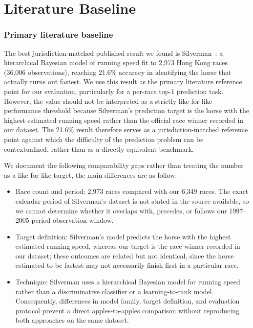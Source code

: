 \section{Literature Baseline}
\label{sec:baseline-lit}

\subsubsection*{\textbf{Primary literature baseline}}
The best jurisdiction-matched published result we found is Silverman~\cite{ejeA_gupta2023}:
a hierarchical Bayesian model of running speed fit to 2,973 Hong Kong races
(36,006 observations), reaching 21.6\% accuracy in identifying the horse that
actually turns out fastest. We use this result as the primary literature reference
point for our evaluation, particularly for a per-race top-1 prediction task.
However, the value should not be interpreted as a strictly like-for-like
performance threshold because Silverman's prediction target is the horse with the
highest estimated running speed rather than the official race winner recorded in
our dataset. The 21.6\% result therefore serves as a jurisdiction-matched reference
point against which the difficulty of the prediction problem can be contextualized,
rather than as a directly equivalent benchmark.

We document the following comparability gaps rather than treating the number as a
like-for-like target, the main differences are as follow:
\begin{itemize}
  \item Race count and period: 2,973 races compared with our 6,349 races.
    The exact calendar period of Silverman's dataset is not stated in the source
    available, so we cannot determine whether it overlaps with, precedes, or
    follows our 1997--2005 period observation window.
  \item Target definition: Silverman's model predicts the horse with the
    highest estimated running speed, whereas our target is the race winner recorded
    in our dataset; these outcomes are related but not identical, since the horse
    estimated to be fastest may not necessarily finish first in a particular race.
  \item Technique: Silverman uses a hierarchical Bayesian model for
    running speed rather than a discriminative classifier or a learning-to-rank
    model. Consequently, differences in model family, target definition, and
    evaluation protocol prevent a direct apples-to-apples comparison without
    reproducing both approaches on the same dataset.
\end{itemize}

